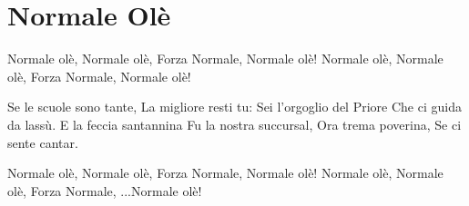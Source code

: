 \section{Normale Olè}
\subtitle{Sulla melodia dell’inno della Sampdoria}
\begin{canzone}
Normale olè, Normale olè,
Forza Normale, Normale olè!
Normale olè, Normale olè,
Forza Normale, Normale olè!

Se le scuole sono tante,
La migliore resti tu:
Sei l'orgoglio del Priore
Che ci guida da lassù.
E la feccia santannina
Fu la nostra succursal,
Ora trema poverina,
Se ci sente cantar.

Normale olè, Normale olè,
Forza Normale, Normale olè!
Normale olè, Normale olè,
Forza Normale, ...Normale olè!
\end{canzone}
